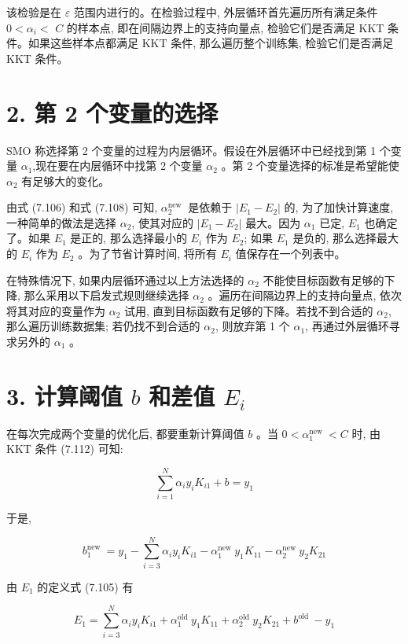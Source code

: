 \documentclass[10pt]{article}
\begin{document}
该检验是在 $\varepsilon$ 范围内进行的。在检验过程中, 外层循环首先遍历所有满足条件 $0<\alpha_{i}<$ $C$ 的样本点, 即在间隔边界上的支持向量点, 检验它们是否满足 KKT 条件。如果这些样本点都满足 KKT 条件, 那么遍历整个训练集, 检验它们是否满足 KKT 条件。

\section*{2. 第 2 个变量的选择}
SMO 称选择第 2 个变量的过程为内层循环。假设在外层循环中已经找到第 1 个变量 $\alpha_{1}$,现在要在内层循环中找第 2 个变量 $\alpha_{2}$ 。第 2 个变量选择的标准是希望能使 $\alpha_{2}$ 有足够大的变化。

由式 (7.106) 和式 (7.108) 可知, $\alpha_{2}^{\text {new }}$ 是依赖于 $\left|E_{1}-E_{2}\right|$ 的, 为了加快计算速度, 一种简单的做法是选择 $\alpha_{2}$, 使其对应的 $\left|E_{1}-E_{2}\right|$ 最大。因为 $\alpha_{1}$ 已定, $E_{1}$ 也确定了。如果 $E_{1}$ 是正的, 那么选择最小的 $E_{i}$ 作为 $E_{2}$; 如果 $E_{1}$ 是负的, 那么选择最大的 $E_{i}$ 作为 $E_{2}$ 。为了节省计算时间, 将所有 $E_{i}$ 值保存在一个列表中。

在特殊情况下, 如果内层循环通过以上方法选择的 $\alpha_{2}$ 不能使目标函数有足够的下降, 那么采用以下启发式规则继续选择 $\alpha_{2}$ 。遍历在间隔边界上的支持向量点, 依次将其对应的变量作为 $\alpha_{2}$ 试用, 直到目标函数有足够的下降。若找不到合适的 $\alpha_{2}$, 那么遍历训练数据集; 若仍找不到合适的 $\alpha_{2}$, 则放弃第 1 个 $\alpha_{1}$, 再通过外层循环寻求另外的 $\alpha_{1}$ 。

\section*{3. 计算阈值 $b$ 和差值 $E_{i}$}
在每次完成两个变量的优化后, 都要重新计算阈值 $b$ 。当 $0<\alpha_{1}^{\text {new }}<C$ 时, 由 KKT 条件 (7.112) 可知:

$$
\sum_{i=1}^{N} \alpha_{i} y_{i} K_{i 1}+b=y_{1}
$$

于是,


\begin{equation*}
b_{1}^{\text {new }}=y_{1}-\sum_{i=3}^{N} \alpha_{i} y_{i} K_{i 1}-\alpha_{1}^{\text {new }} y_{1} K_{11}-\alpha_{2}^{\text {new }} y_{2} K_{21} \tag{7.114}
\end{equation*}


由 $E_{1}$ 的定义式 (7.105) 有

$$
E_{1}=\sum_{i=3}^{N} \alpha_{i} y_{i} K_{i 1}+\alpha_{1}^{\text {old }} y_{1} K_{11}+\alpha_{2}^{\text {old }} y_{2} K_{21}+b^{\text {old }}-y_{1}
$$
\end{document}
